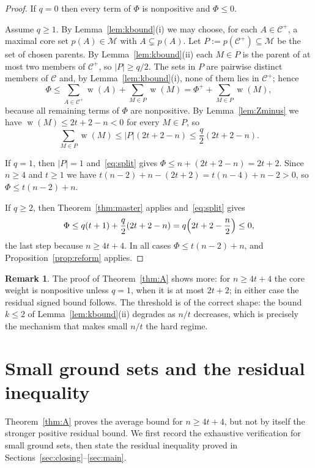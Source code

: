 \documentclass[11pt,a4paper]{amsart}
\theoremstyle{plain}
\theoremstyle{definition}
\newtheorem{remark}[theorem]{Remark}
\newcommand{\Cc}{\mathcal{C}}
\newcommand{\Mm}{\mathcal{M}}
\newcommand{\Cp}{\Cc^{+}}
\DeclareMathOperator{\wt}{w}
\begin{document}
\begin{proof}
If $q=0$ then every term of $\Phi$ is nonpositive and $\Phi\le0$.

Assume $q\ge1$. By Lemma~\ref{lem:kbound}(i) we may choose, for each
$A\in\Cp$, a maximal core set $p(A)\in\Mm$ with $A\subsetneq p(A)$. Let
$P:=p(\Cp)\subseteq\Mm$ be the set of chosen parents. By
Lemma~\ref{lem:kbound}(ii) each $M\in P$ is the parent of at most two members of
$\Cp$, so $|P|\ge q/2$. The sets in $P$ are pairwise distinct members of $\Cc$
and, by Lemma~\ref{lem:kbound}(i), none of them lies in $\Cp$; hence
\begin{equation}\label{eq:split}
  \Phi
  \le
  \sum_{A\in\Cp}\wt(A)+\sum_{M\in P}\wt(M)
  =
  \Phi^++\sum_{M\in P}\wt(M),
\end{equation}
because all remaining terms of $\Phi$ are nonpositive. By Lemma~\ref{lem:Zminus}
we have $\wt(M)\le2t+2-n<0$ for every $M\in P$, so
\[
  \sum_{M\in P}\wt(M)\le |P|(2t+2-n)\le\frac q2(2t+2-n).
\]

If $q=1$, then $|P|=1$ and~\eqref{eq:split} gives
$\Phi\le n+(2t+2-n)=2t+2$. Since $n\ge4$ and $t\ge1$ we have
$t(n-2)+n-(2t+2)=t(n-4)+n-2>0$, so $\Phi\le t(n-2)+n$.

If $q\ge2$, then Theorem~\ref{thm:master} applies and~\eqref{eq:split} gives
\[
  \Phi
  \le
  q(t+1)+\frac q2(2t+2-n)
  =
  q\Bigl(2t+2-\frac n2\Bigr)
  \le0,
\]
the last step because $n\ge4t+4$. In all cases $\Phi\le t(n-2)+n$, and
Proposition~\ref{prop:reform} applies.
\end{proof}

\begin{remark}
The proof of Theorem~\ref{thm:A} shows more: for $n\ge4t+4$ the core weight is
nonpositive unless $q=1$, when it is at most $2t+2$; in either case the
residual signed bound follows. The threshold is of
the correct shape: the bound $k\le2$ of Lemma~\ref{lem:kbound}(ii) degrades as
$n/t$ decreases, which is precisely the mechanism that makes small $n/t$ the hard
regime.
\end{remark}

\section{Small ground sets and the residual inequality}\label{sec:conj}

Theorem~\ref{thm:A} proves the average bound for $n\ge4t+4$, but not by
itself the stronger positive residual bound. We first record the exhaustive
verification for small ground sets, then state the residual inequality proved
in Sections~\ref{sec:closing}--\ref{sec:main}.
\end{document}
